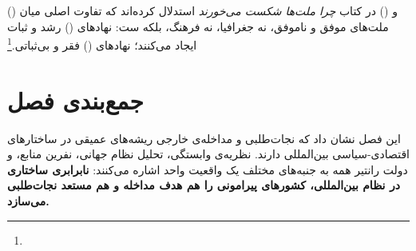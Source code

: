  () و  () در کتاب \textit{چرا ملت‌ها شکست می‌خورند} استدلال کرده‌اند که تفاوت اصلی میان ملت‌های موفق و ناموفق، نه جغرافیا، نه فرهنگ، بلکه ست: نهادهای  () رشد و ثبات ایجاد می‌کنند؛ نهادهای  () فقر و بی‌ثباتی.\footnote{}


\section{جمع‌بندی فصل}
\label{sec:ch12-conclusion}

این فصل نشان داد که نجات‌طلبی و مداخله‌ی خارجی ریشه‌های عمیقی در ساختارهای اقتصادی-سیاسی بین‌المللی دارند. نظریه‌ی وابستگی، تحلیل نظام جهانی، نفرین منابع، و دولت رانتیر همه به جنبه‌های مختلف یک واقعیت واحد اشاره می‌کنند: \textbf{نابرابری ساختاری در نظام بین‌المللی، کشورهای پیرامونی را هم هدف مداخله و هم مستعد نجات‌طلبی می‌سازد.}

